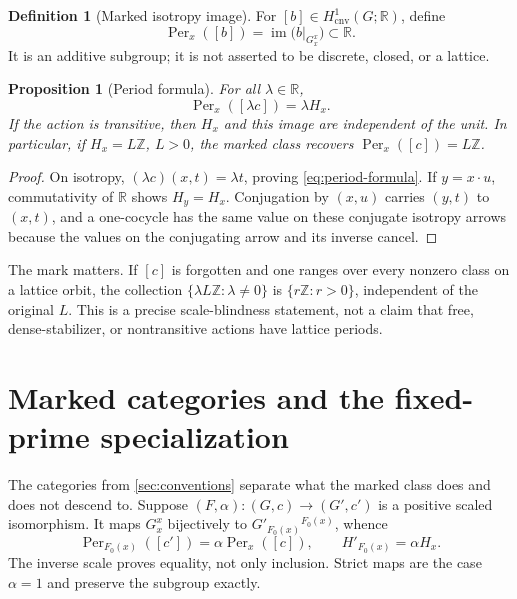 \documentclass[11pt]{article}
\newtheorem{proposition}[theorem]{Proposition}
\theoremstyle{definition}
\newtheorem{definition}[theorem]{Definition}
\newcommand{\R}{\mathbb R}
\newcommand{\Z}{\mathbb Z}
\newcommand{\Hcnv}{H_{\mathrm{cnv}}}
\newcommand{\Per}{\operatorname{Per}}
\newcommand{\im}{\operatorname{im}}
\begin{document}
\begin{definition}[Marked isotropy image]
\label{def:period}
For $[b]\in\Hcnv^1(G;\R)$, define
\begin{equation}
\label{eq:period-def}
 \Per_x([b])=\im\bigl(b|_{G_x^x}\bigr)\subset\R.
\end{equation}
It is an additive subgroup; it is not asserted to be discrete, closed, or a
lattice.
\end{definition}

\begin{proposition}[Period formula]
\label{prop:period}
For all $\lambda\in\R$,
\begin{equation}
\label{eq:period-formula}
 \Per_x([\lambda c])=\lambda H_x.
\end{equation}
If the action is transitive, then $H_x$ and this image are independent of
the unit.  In particular, if $H_x=L\Z$, $L>0$, the marked class recovers
$\Per_x([c])=L\Z$.
\end{proposition}

\begin{proof}
On isotropy, $(\lambda c)(x,t)=\lambda t$, proving
\cref{eq:period-formula}.  If $y=x\mathbin{\cdot}u$, commutativity of $\R$
shows $H_y=H_x$.  Conjugation by $(x,u)$ carries $(y,t)$ to $(x,t)$, and a
one-cocycle has the same value on these conjugate isotropy arrows because
the values on the conjugating arrow and its inverse cancel.
\end{proof}

The mark matters.  If $[c]$ is forgotten and one ranges over every nonzero
class on a lattice orbit, the collection
$\{\lambda L\Z:\lambda\neq0\}$ is $\{r\Z:r>0\}$, independent of the
original $L$.  This is a precise scale-blindness statement, not a claim that
free, dense-stabilizer, or nontransitive actions have lattice periods.

\section{Marked categories and the fixed-prime specialization}
\label{sec:categories-packet}

The categories from \cref{sec:conventions} separate what the marked class
does and does not descend to.  Suppose $(F,\alpha):(G,c)\to(G',c')$ is a
positive scaled isomorphism.  It maps $G_x^x$ bijectively to
$G'_{F_0(x)}{}^{F_0(x)}$, whence
\begin{equation}
\label{eq:scaled-covariance}
 \Per_{F_0(x)}([c'])=\alpha\Per_x([c]),
 \qquad H'_{F_0(x)}=\alpha H_x.
\end{equation}
The inverse scale proves equality, not only inclusion.  Strict maps are the
case $\alpha=1$ and preserve the subgroup exactly.
\end{document}

